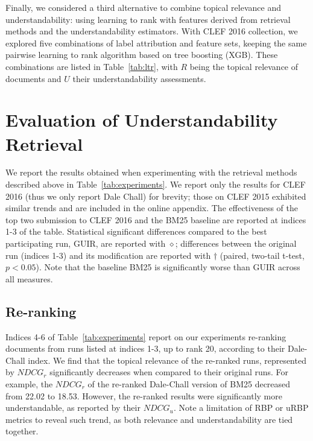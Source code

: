 Finally, we considered a third alternative to combine topical relevance and understandability: using learning to rank with features derived from retrieval methods and the understandability estimators.
With CLEF 2016 collection, we explored five combinations of label attribution and feature sets, keeping the same pairwise learning to rank algorithm based on tree boosting (XGB).
These combinations are listed in Table~\ref{tab:ltr}, with $R$ being the topical relevance of documents and $U$ their understandability assessments. 





\vspace{-10pt}
\section{Evaluation of Understandability Retrieval}
\label{sec:results}

We report the results obtained when experimenting with the retrieval methods described above in Table~\ref{tab:experiments}. We report only the results for CLEF 2016 (thus we only report Dale Chall) for brevity; those on CLEF 2015 exhibited similar trends and are included in the online appendix. The effectiveness of the top two submission to CLEF 2016 and the BM25 baseline are reported at indices 1-3 of the table. Statistical significant differences compared to the best participating run, GUIR, are reported with $\diamond$; differences between the original run (indices 1-3) and its modification are reported with $\dagger$ (paired, two-tail t-test, $p<0.05$). Note that the baseline BM25 is significantly worse than GUIR across all measures. 


\subsection{Re-ranking}
\label{results:reranking}

Indices 4-6 of Table~\ref{tab:experiments} report on our experiments re-ranking documents from runs listed at indices 1-3, up to rank 20, according to their Dale-Chall index.
We find that the topical relevance of the re-ranked runs, represented by $NDCG_r$ significantly decreases when compared to their original runs. For example, the $NDCG_r$ of the re-ranked Dale-Chall version of BM25 decreased from 22.02 to 18.53. However, the re-ranked results were significantly more understandable, as reported by their $NDCG_u$. 
Note a limitation of RBP or uRBP metrics to reveal such trend, as both relevance and understandability are tied together.

